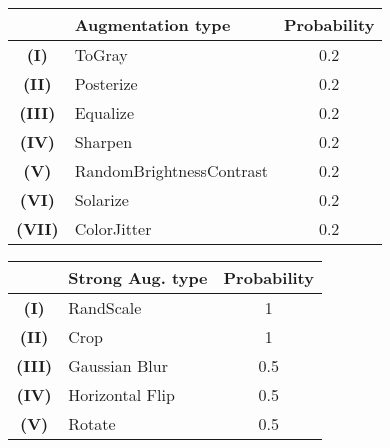 \begin{table*}
    \parbox{.5\linewidth}{
    \centering
         \begin{tabular}{cl|c}
       \toprule
        &Augmentation type &Probability \\
        \midrule
        \textbf{(I)} &ToGray  &0.2 \\
        \textbf{(II)} &Posterize &0.2 \\
        \textbf{(III)} &Equalize &0.2 \\
        \textbf{(IV)} &Sharpen &0.2 \\
        \textbf{(V)} &RandomBrightnessContrast &0.2 \\
        \textbf{(VI)} &Solarize &0.2 \\
        \textbf{(VII)} &ColorJitter &0.2 \\\bottomrule
        
 
\end{tabular}
    \caption{\textbf{CATs~\cite{cho2021semantic} Aug. Type. }}
    \label{catsaug}
       
    }
    \hfill
    \parbox{.45\linewidth}{
    \centering
        
       \begin{tabular}{cl|c}
       \toprule
        &Strong Aug. type &Probability \\
        \midrule
        \textbf{(I)} &RandScale  &1 \\
        \textbf{(II)} &Crop &1 \\
        \textbf{(III)} &Gaussian Blur &0.5 \\
        \textbf{(IV)} &Horizontal Flip &0.5 \\
         \textbf{(V)} &Rotate &0.5 \\
        \bottomrule
        

\end{tabular}
    \caption{\textbf{PFE-Net~\cite{tian2020prior} Aug. Type.}}
    \label{pfeaug}
   
    }
\end{table*}
